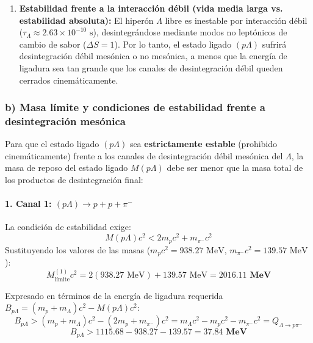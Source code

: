 \begin{problema}
\begin{enumerate}[label=\arabic*.]
    \item \textbf{Estabilidad frente a la interacción débil (vida media larga vs. estabilidad absoluta):}
    El hiperón $\Lambda$ libre es inestable por interacción débil ($\tau_\Lambda \approx 2.63 \times 10^{-10}\text{ s}$), desintegrándose mediante modos no leptónicos de cambio de sabor ($\Delta S = 1$). Por lo tanto, el estado ligado $(p\Lambda)$ sufrirá desintegración débil mesónica o no mesónica, a menos que la energía de ligadura sea tan grande que los canales de desintegración débil queden cerrados cinemáticamente.
\end{enumerate}

\subsubsection*{b) Masa límite y condiciones de estabilidad frente a desintegración mesónica}

Para que el estado ligado $(p\Lambda)$ sea \textbf{estrictamente estable} (prohibido cinemáticamente) frente a los canales de desintegración débil mesónica del $\Lambda$, la masa de reposo del estado ligado $M(p\Lambda)$ debe ser menor que la masa total de los productos de desintegración final:

\paragraph{1. Canal 1: $(p\Lambda) \longrightarrow p + p + \pi^-$}
La condición de estabilidad exige:
\begin{equation*}
M(p\Lambda)c^2 < 2 m_p c^2 + m_{\pi^-} c^2
\end{equation*}
Sustituyendo los valores de las masas ($m_p c^2 = 938.27\text{ MeV}$, $m_{\pi^-} c^2 = 139.57\text{ MeV}$):
\begin{equation*}
M_{\text{límite}}^{(1)} c^2 = 2(938.27\text{ MeV}) + 139.57\text{ MeV} = \mathbf{2016.11\text{ MeV}}
\end{equation*}

Expresado en términos de la energía de ligadura requerida $B_{p\Lambda} = (m_p + m_\Lambda) c^2 - M(p\Lambda) c^2$:
\begin{equation*}
B_{p\Lambda} > (m_p + m_\Lambda)c^2 - (2 m_p + m_{\pi^-})c^2 = m_\Lambda c^2 - m_p c^2 - m_{\pi^-} c^2 = Q_{\Lambda \to p\pi^-}
\end{equation*}
\begin{equation*}
B_{p\Lambda} > 1115.68 - 938.27 - 139.57 = \mathbf{37.84\text{ MeV}}
\end{equation*}


\end{problema}
